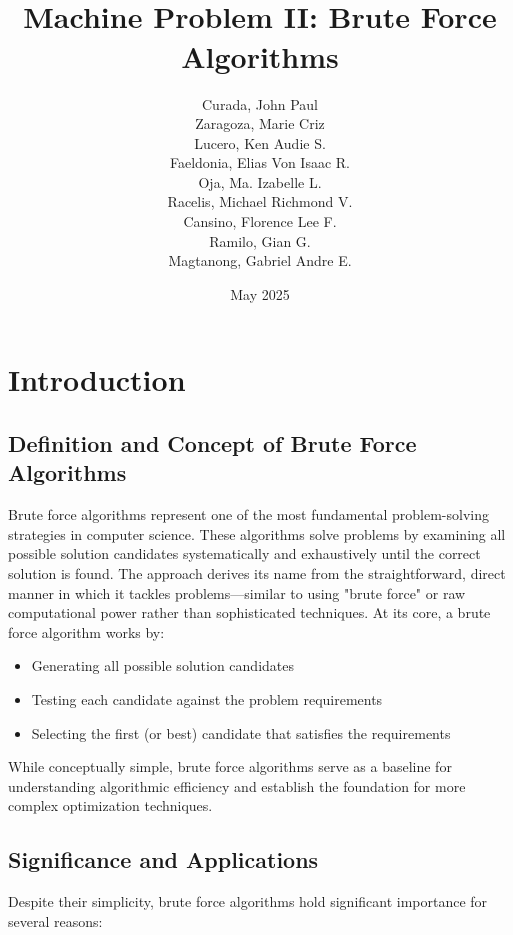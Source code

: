 \documentclass{article}
\title{\\[3em]Machine Problem II: Brute Force Algorithms\\[3em]}
\author{Curada, John Paul \\ Zaragoza, Marie Criz \\ Lucero, Ken Audie S. \\ Faeldonia, Elias Von Isaac R. \\ Oja, Ma. Izabelle L. \\ Racelis, Michael Richmond V. \\ Cansino, Florence Lee F. \\ Ramilo, Gian G. \\ Magtanong, Gabriel Andre E.\\[2em] }
\date{May 2025}
\begin{document}
\fancyhf{} %

\fancyfoot[R]{\thepage} %
\renewcommand{\headrulewidth}{0pt} %


\renewcommand{\arraystretch}{1.2}

\maketitle
\newpage

\tableofcontents  %
\newpage          %

            
\clearpage

\section{Introduction}
\subsection*{Definition and Concept of Brute Force Algorithms}
Brute force algorithms represent one of the most fundamental problem-solving strategies in computer science. These algorithms solve problems by examining all possible solution candidates systematically and exhaustively until the correct solution is found. The approach derives its name from the straightforward, direct manner in which it tackles problems—similar to using "brute force" or raw computational power rather than sophisticated techniques.
At its core, a brute force algorithm works by:

\begin{itemize}
    \item Generating all possible solution candidates
    \item Testing each candidate against the problem requirements
    \item Selecting the first (or best) candidate that satisfies the requirements
\end{itemize}
While conceptually simple, brute force algorithms serve as a baseline for understanding algorithmic efficiency and establish the foundation for more complex optimization techniques.
    
\subsection*{Significance and Applications}
Despite their simplicity, brute force algorithms hold significant importance for several reasons:
\end{document}
